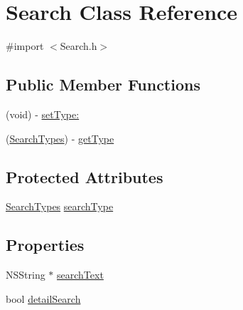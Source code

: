 \hypertarget{interface_search}{\section{Search Class Reference}
\label{interface_search}
}


{\ttfamily \#import $<$Search.\-h$>$}

\subsection*{Public Member Functions}
\begin{DoxyCompactItemize}
\item 
(void) -\/ \hyperlink{interface_search_a9d62386782c6f59640a57509ce57bdf8}{set\-Type\-:}
\item 
(\hyperlink{_search_8h_aa716c37ae8860728cc89f2ec7b83f317}{Search\-Types}) -\/ \hyperlink{interface_search_a30cb21932344a680d4143823100c293f}{get\-Type}
\end{DoxyCompactItemize}
\subsection*{Protected Attributes}
\begin{DoxyCompactItemize}
\item 
\hyperlink{_search_8h_aa716c37ae8860728cc89f2ec7b83f317}{Search\-Types} \hyperlink{interface_search_ad17cb690f7a8d67a7502d2b540ac31f3}{search\-Type}
\end{DoxyCompactItemize}
\subsection*{Properties}
\begin{DoxyCompactItemize}
\item 
N\-S\-String $\ast$ \hyperlink{interface_search_a6966d081462b1fd02c8e9a6441f12e1b}{search\-Text}
\item 
bool \hyperlink{interface_search_aabe1a30087c58839cafb877e79348df1}{detail\-Search}
\end{DoxyCompactItemize}


